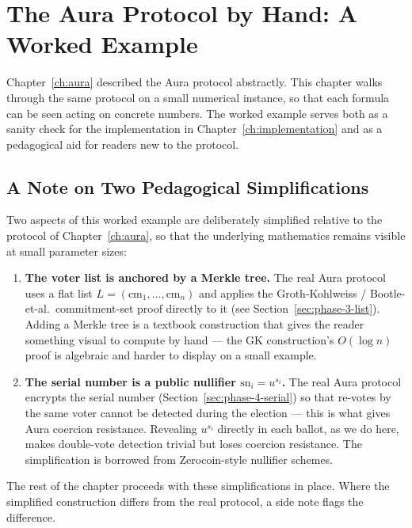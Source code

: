 \documentclass[12pt,a4paper,oneside]{report}
\begin{document}
\chapter{The Aura Protocol by Hand: A Worked Example}
\label{ch:byhand}

Chapter~\ref{ch:aura} described the Aura protocol abstractly. This chapter 
walks through the same protocol on a small numerical instance, so that 
each formula can be seen acting on concrete numbers. The worked example 
serves both as a sanity check for the implementation in 
Chapter~\ref{ch:implementation} and as a pedagogical aid for readers new 
to the protocol.

\section*{A Note on Two Pedagogical Simplifications}

Two aspects of this worked example are deliberately simplified relative to 
the protocol of Chapter~\ref{ch:aura}, so that the underlying mathematics 
remains visible at small parameter sizes:

\begin{enumerate}
    \item \textbf{The voter list is anchored by a Merkle tree.} The real 
    Aura protocol uses a flat list $L = (\text{cm}_1, \ldots, \text{cm}_n)$ 
    and applies the Groth-Kohlweiss / Bootle-et-al.\ commitment-set proof 
    directly to it (see Section~\ref{sec:phase-3-list}). Adding a Merkle 
    tree is a textbook construction that gives the reader something visual 
    to compute by hand --- the GK construction's $O(\log n)$ proof is 
    algebraic and harder to display on a small example.
    
    \item \textbf{The serial number is a public nullifier $\text{sn}_i = u^{s_i}$.} 
    The real Aura protocol encrypts the serial number 
    (Section~\ref{sec:phase-4-serial}) so that re-votes by the same voter 
    cannot be detected during the election --- this is what gives Aura 
    coercion resistance. Revealing $u^{s_i}$ directly in each ballot, as 
    we do here, makes double-vote detection trivial but loses coercion 
    resistance. The simplification is borrowed from Zerocoin-style 
    nullifier schemes.
\end{enumerate}

The rest of the chapter proceeds with these simplifications in place. 
Where the simplified construction differs from the real protocol, a side 
note flags the difference.
\end{document}
